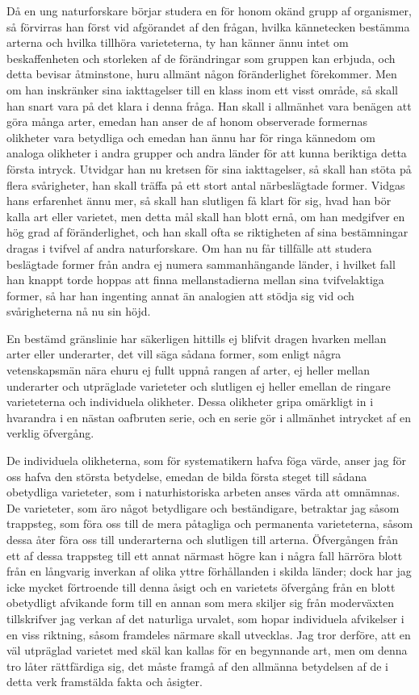 Då en ung naturforskare börjar studera en för honom okänd grupp af organismer, så förvirras han först vid afgörandet af den frågan, hvilka kännetecken bestämma arterna och hvilka tillhöra varieteterna, ty han känner ännu intet om beskaffenheten och storleken af de förändringar som gruppen kan erbjuda, och detta bevisar åtminstone, huru allmänt någon föränderlighet förekommer. Men om han inskränker sina iakttagelser till en klass inom ett visst område, så skall han snart vara på det klara i denna fråga. Han skall i allmänhet vara benägen att göra många arter, emedan han anser de af honom observerade formernas olikheter vara betydliga och emedan han ännu har för ringa kännedom om analoga olikheter i andra grupper och andra länder för att kunna beriktiga detta första intryck. Utvidgar han nu kretsen för sina iakttagelser, så skall han stöta på flera svårigheter, han skall träffa på ett stort antal närbeslägtade former. Vidgas hans erfarenhet ännu mer, så skall han slutligen få klart för sig, hvad han bör kalla art eller varietet, men detta mål skall han blott ernå, om han medgifver en hög grad af föränderlighet, och han skall ofta se riktigheten af sina bestämningar dragas i tvifvel af andra naturforskare. Om han nu får tillfälle att studera beslägtade former från andra ej numera sammanhängande länder, i hvilket fall han knappt torde hoppas att finna mellanstadierna mellan sina tvifvelaktiga former, så har han ingenting annat än analogien att stödja sig vid och svårigheterna nå nu sin höjd.

En bestämd gränslinie har säkerligen hittills ej blifvit dragen hvarken mellan arter eller underarter, det vill säga sådana former, som enligt några vetenskapsmän nära ehuru ej fullt uppnå rangen af arter, ej heller mellan underarter och utpräglade varieteter och slutligen ej heller emellan de ringare varieteterna och individuela olikheter. Dessa olikheter gripa omärkligt in i hvarandra i en nästan oafbruten serie, och en serie gör i allmänhet intrycket af en verklig öfvergång.

De individuela olikheterna, som för systematikern hafva föga värde, anser jag för oss hafva den största betydelse, emedan de bilda första steget till sådana obetydliga varieteter, som i naturhistoriska arbeten anses värda att omnämnas. De varieteter, som äro något betydligare och beständigare, betraktar jag såsom trappsteg, som föra oss till de mera påtagliga och permanenta varieteterna, såsom dessa åter föra oss till underarterna och slutligen till arterna. Öfvergången från ett af dessa trappsteg till ett annat närmast högre kan i några fall härröra blott från en långvarig inverkan af olika yttre förhållanden i skilda länder; dock har jag icke mycket förtroende till denna åsigt och en varietets öfvergång från en blott obetydligt afvikande form till en annan som mera skiljer sig från moderväxten tillskrifver jag verkan af det naturliga urvalet, som hopar individuela afvikelser i en viss riktning, såsom framdeles närmare skall utvecklas. Jag tror derföre, att en väl utpräglad varietet med skäl kan kallas för en begynnande art, men om denna tro låter rättfärdiga sig, det måste framgå af den allmänna betydelsen af de i detta verk framstälda fakta och åsigter.

